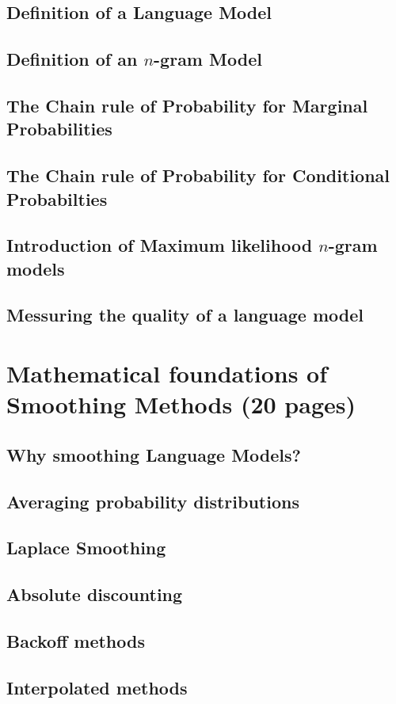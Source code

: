 \documentclass[•]{book}
\begin{document}
\section{Definition of a Language Model}
\section{Definition of an $n$-gram Model}
\section{The Chain rule of Probability for Marginal Probabilities}
\section{The Chain rule of Probability for Conditional Probabilties}
\section{Introduction of Maximum likelihood $n$-gram models}
\section{Messuring the quality of a language model}

\chapter{Mathematical foundations of Smoothing Methods (20 pages)}
\section{Why smoothing Language Models?}
\section{Averaging probability distributions}
\section{Laplace Smoothing}
\section{Absolute discounting}
\section{Backoff methods}
\section{Interpolated methods}
\end{document}
